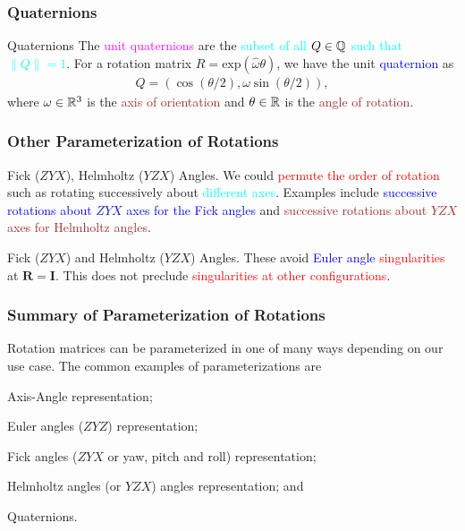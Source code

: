 \begin{frame}
	\frametitle{Quaternions}
	\begin{block}{Quaternions}
		The \textcolor{magenta}{unit quaternions} are the \textcolor{cyan}{subset of all $Q \in \mathbb{Q}$ such that $\|Q\| = 1$}. For a rotation matrix $R = \text{exp}(\hat{\omega}\theta)$, we have the unit \textcolor{blue}{quaternion} as 
		\begin{align}
			Q = \left(\cos(\theta/2), \omega \sin \left(\theta/2\right) \right),
		\end{align}
		where $\omega \in \mathbb{R}^3$ is the \textcolor{brown}{axis of orientation} and $\theta \in \mathbb{R}$ is the \textcolor{brown}{angle of rotation}.
	\end{block}
\end{frame}

\begin{frame}
	\frametitle{Other Parameterization of Rotations}
	\begin{block}{Fick ($ZYX$), Helmholtz ($YZX$) Angles.}
		 We could \textcolor{red}{permute the order of rotation} such as rotating successively about \textcolor{cyan}{different axes}. Examples include \textcolor{blue}{successive rotations about $ZYX$ axes for the Fick angles} and \textcolor{brown}{successive rotations about $YZX$ axes for Helmholtz angles}.
	\end{block}
	
	\begin{block}{Fick ($ZYX$) and Helmholtz ($YZX$) Angles.}
		These avoid \textcolor{blue}{Euler angle} \textcolor{red}{singularities} at $\bm{R} = \bm{I}$. This does not preclude \textcolor{red}{singularities at other configurations}.
	\end{block}
\end{frame}


\begin{frame}
	\frametitle{Summary of Parameterization of Rotations}
	\begin{tcolorbox}[title=Summary of Parameterizations]
		Rotation matrices can be parameterized in one of many ways depending on our use case. The common examples of parameterizations are 
		\begin{inparaenum} \newline
			\item Axis-Angle representation; \newline
			\item Euler  angles ($ZYZ$) representation; \newline
			\item Fick  angles (\ie $ZYX$ or yaw, pitch and roll)  representation; \newline
			\item Helmholtz angles (or $YZX$) angles representation; and \newline
			\item Quaternions.
		\end{inparaenum}
		
	\end{tcolorbox}
\end{frame}